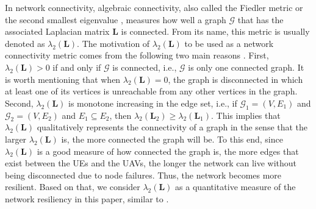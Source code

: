\documentclass[conference]{IEEEtran}
\begin{document}
In network connectivity, algebraic connectivity, also called the Fiedler metric or the second smallest eigenvalue \cite{new}, measures how well a graph $\mathcal G$ that has the associated Laplacian matrix $\mathbf L$ is connected. From its name, this metric is usually denoted as $\lambda_2(\mathbf L)$. 
The motivation of $\lambda_2(\mathbf L)$ to be used as a network connectivity metric comes from the following two main reasons \cite{new}. First, $\lambda_2 (\mathbf L) > 0$ if and only if $\mathcal G$ is connected, i.e., $\mathcal G$ is only one connected graph. It is worth mentioning that when $\lambda_2(\mathbf L)=0$, the graph is disconnected in which at least one of its vertices is unreachable from any other vertices in the graph. Second,  $\lambda_2 (\mathbf L)$ is monotone increasing in the edge set, i.e., if $\mathcal G_1=(V, E_1)$ and $\mathcal G_2=(V, E_2)$ and $E_1 \subseteq E_2$, then $\lambda_2 (\mathbf L_2) \geq \lambda_2 (\mathbf L_1)$. This implies that $\lambda_2(\mathbf L)$ qualitatively represents the connectivity of a graph in the sense that the larger $\lambda_2(\mathbf L)$ is, the more connected the graph will be. To this end, since $\lambda_2 (\mathbf L)$ is a good measure of how connected the graph is, the more edges that exist between the UEs and the UAVs, the longer the network can live without being disconnected due to node failures. Thus, the  network becomes more  resilient. Based on that, we consider $\lambda_2 (\mathbf L)$ as a quantitative measure of the network resiliency in this paper, similar to \cite{4657335, new_lifetime}. %
\end{document}
